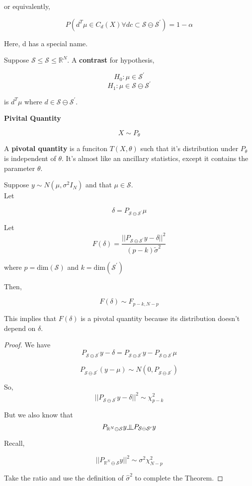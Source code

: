 \documentclass[11pt,fleqn]{book} %
\newcommand{\indep}{\rotatebox[origin=c]{90}{$\models$}}
\begin{document}
or equivalently, 

		$$P(d^T \mu \in C_d(X) \forall dc \subset \mathcal{S} \ominus \mathcal{S}^\prime ) = 1 - \alpha$$

Here, d has a special name.

\begin{definition}[Contrast]
	Suppose $\mathcal{S} \leq \mathcal{S} \leq \mathbb{R}^N$.  A \textbf{contrast} for hypothesis, 

		$$H_0: \mu \in \mathcal{S}^\prime$$
		$$H_1: \mu \in \mathcal{S} \ominus \mathcal{S}^\prime $$

	is $d^T\mu$ where $d \in \mathcal{S} \ominus \mathcal{S}^\prime $. 
\end{definition}

\textbf{Pivital Quantity}\\

\begin{definition}
	$$X \sim P_\theta$$

	A \textbf{pivotal quantity} is a funciton $T(X, \theta)$ such that it's distribution under $P_\theta$ is independent of $\theta$. It's almost like an ancillary statistics, except it contains the parameter $\theta$. 
\end{definition}

\begin{theorem}
	Suppose $y \sim N(\mu, \sigma^2 I_N)$ and that $\mu \in \mathcal{S}$.\\

	 Let 

		$$\delta = P_{\mathcal{S} \ominus \mathcal{S}^\prime}\mu$$

	Let 
		$$F(\delta) = \frac{||P_{\mathcal{S} \ominus \mathcal{S}^\prime}y - \delta ||^2}{(p-k) \tilde{\sigma}^2}$$

		where $p = \text{dim}(\mathcal{S})$ and $k = \text{dim}(\mathcal{S}^\prime)$

	Then,

		$$F(\delta) \sim F_{p-k, N-p} $$
\end{theorem}

This implies that $F(\delta)$ is a pivotal quantity because its distribution doesn't depend on $\delta$.

\begin{proof}
	We have
		$$P_{\mathcal{S} \ominus \mathcal{S}^\prime}y - \delta  = P_{\mathcal{S} \ominus \mathcal{S}^\prime}y - P_{\mathcal{S} \ominus \mathcal{S}^\prime}\mu$$

		$$P_{\mathcal{S} \ominus \mathcal{S}^\prime}(y - \mu) \sim N(0, P_{\mathcal{S} \ominus \mathcal{S}^\prime})$$

	So, 
		$$||P_{\mathcal{S} \ominus \mathcal{S}^\prime}y - \delta ||^2 \sim \chi^2_{p-k}$$

	But we also know that 
		$$P_{\mathbb{R}^N \ominus \mathcal{S}} y \indep P_{\mathcal{S} \ominus \mathcal{S}^\prime}y  $$

	Recall, 

		$$||P_{\mathbb{R}^N \ominus \mathcal{S}}y||^2 \sim \sigma^2 \chi^2_{N-p} $$

	Take the ratio and use the definition of $\hat{\sigma}^2$ to complete the Theorem.
\end{proof}
\end{document}
